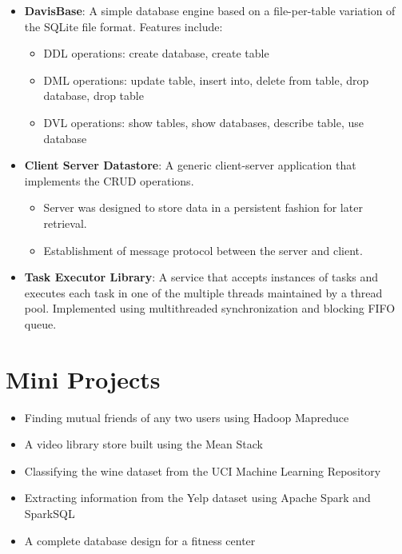 \documentclass[letterpaper,11pt]{article}
\begin{document}
\begin{itemize}[noitemsep,nolistsep,leftmargin=*]
\item \textbf{DavisBase}: A simple database engine based on a file-per-table variation of the SQLite file format. Features include:
 \begin{itemize}[noitemsep,nolistsep,leftmargin=*]
\item DDL operations: create database, create table 
 \item DML operations: update table, insert into, delete from table, drop database, drop table
 \item DVL operations: show tables, show databases, describe table, use database
      \end{itemize}
\item \textbf{Client Server Datastore}: A generic client-server application that implements the CRUD operations.  
 \begin{itemize}[noitemsep,nolistsep,leftmargin=*]
 \item Server was designed to store data in a persistent fashion for later retrieval. \item Establishment of message protocol between the server and client.
 \end{itemize}

\item \textbf{Task Executor Library}: A service that accepts instances of tasks and executes each task in one of the multiple threads maintained by a thread pool. Implemented using multithreaded synchronization and blocking FIFO queue.
 \end{itemize}
     

 
\section{Mini Projects}
\begin{itemize}[noitemsep,nolistsep,leftmargin=*]
\item Finding mutual friends of any two users using Hadoop Mapreduce
\item A video library store built using the Mean Stack
\item Classifying the wine dataset from the UCI Machine Learning Repository
\item Extracting information from the Yelp dataset using Apache Spark and SparkSQL
\item A complete database design for a fitness center 
\end{itemize}
\end{document}
